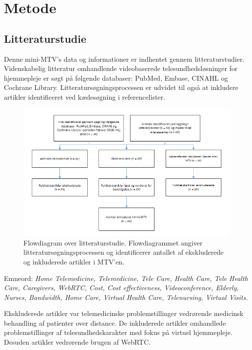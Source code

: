 \chapter{Metode}

\section{Litteraturstudie}
Denne mini-MTV's data og informationer er indhentet gennem litteraturstudier. Videnskabelig litteratur omhandlende videobaserede telesundhedsløsninger for hjemmepleje er søgt på følgende databaser: PubMed, Embase, CINAHL og Cochrane Library. Litteratursøgningsprocessen er udvidet til også at inkludere artikler identificeret ved kædesøgning i referencelister.

\begin{figure}[H]
\centering
\includegraphics[width=1\textwidth]{Figurer/metode_flow.png}
\caption{\label{fig:metodeflow}Flowdiagram over  litteraturstudie. Flowdiagrammet angiver litteratursøgningsprocessen og identificerer antallet af ekskluderede og inkluderede artikler i MTV'en.}
\end{figure}

Emneord: \textit{Home Telemedicine, Telemedicine, Tele Care, Health Care, Tele Health Care, Caregivers, WebRTC, Cost, Cost effectiveness, Videoconference, Elderly, Nurses, Bandwidth, Home Care, Virtual Health Care, Telenursing, Virtual Visits.}

Ekskluderede artikler var telemedicinske problemstillinger vedrørende medicinsk behandling af patienter over distance. De inkluderede artikler omhandlede problemstillinger af telesundhedskarakter med fokus på virtuel hjemmepleje. Desuden artikler vedrørende brugen af WebRTC.  

